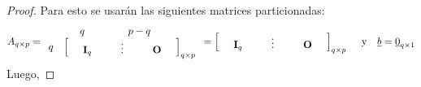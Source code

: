 \documentclass[
]{book}
\theoremstyle{definition}
\theoremstyle{definition}
\theoremstyle{definition}
\theoremstyle{definition}
\theoremstyle{remark}
\begin{document}
\begin{proof}
Para esto se usarán las siguientes matrices particionadas:
\[
A_{q\times p}=\begin{array}{cc}
 &\hspace{0.5cm}  q \hspace{1.5cm}  p-q \hspace{1.5cm} \\
 q & \begin{bmatrix}
\hspace{0.5cm} \mathbf{I}_q \hspace{1.0cm} \vdots \hspace{1.0cm} \mathbf{O} \hspace{0.5cm}
 \end{bmatrix}_{q\times p}
\end{array}=\begin{bmatrix}
\hspace{0.5cm} \mathbf{I}_q \hspace{1.0cm} \vdots \hspace{1.0cm} \mathbf{O} \hspace{0.5cm}
 \end{bmatrix}_{q\times p}\ \ \ \ \text{y}\  \ \ \underline{b}=\underline{0}_{q\times 1}
\]
Luego,


\end{proof}
\end{document}
